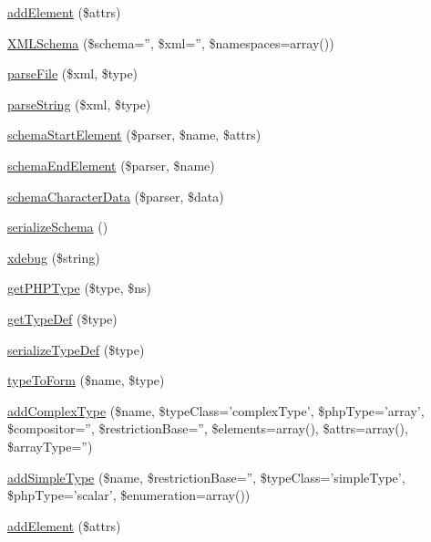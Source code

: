 \begin{DoxyCompactItemize}
\hyperlink{class_x_m_l_schema_a7341d393047f63fdcb50dd44d2eff448}{add\-Element} (\$attrs)
\item 
\hyperlink{class_x_m_l_schema_a61d4e34cfda30d67186a9a6094c6d7c9}{X\-M\-L\-Schema} (\$schema='', \$xml='', \$namespaces=array())
\item 
\hyperlink{class_x_m_l_schema_a4495d09bfd675f7fbd6b6918ecc84795}{parse\-File} (\$xml, \$type)
\item 
\hyperlink{class_x_m_l_schema_ad3efb7e0aa9ceb47b09783473a7deae6}{parse\-String} (\$xml, \$type)
\item 
\hyperlink{class_x_m_l_schema_abe761abcfe8369fb87739c8d776eead0}{schema\-Start\-Element} (\$parser, \$name, \$attrs)
\item 
\hyperlink{class_x_m_l_schema_a8e536da75a8a0d3f44d6d275ff4229c9}{schema\-End\-Element} (\$parser, \$name)
\item 
\hyperlink{class_x_m_l_schema_af69d1aa4838f91acf8066b8f33e2a016}{schema\-Character\-Data} (\$parser, \$data)
\item 
\hyperlink{class_x_m_l_schema_ae1f5bc3d8e49c4592e8d00d7890f3e47}{serialize\-Schema} ()
\item 
\hyperlink{class_x_m_l_schema_af7f8d34ac5331189b07d83cb9fa5f4e9}{xdebug} (\$string)
\item 
\hyperlink{class_x_m_l_schema_aebfbaab31cdb69fabf5a7c5f2bbd605b}{get\-P\-H\-P\-Type} (\$type, \$ns)
\item 
\hyperlink{class_x_m_l_schema_a4d3354e230b2cbe9cbf168665ef0a79d}{get\-Type\-Def} (\$type)
\item 
\hyperlink{class_x_m_l_schema_a6ede91c15c6a31e99181cd698f06365c}{serialize\-Type\-Def} (\$type)
\item 
\hyperlink{class_x_m_l_schema_ad829fa57be032e351ebf74b60918c8ba}{type\-To\-Form} (\$name, \$type)
\item 
\hyperlink{class_x_m_l_schema_a8086789ccd44f879ab77ba98dfa08aa2}{add\-Complex\-Type} (\$name, \$type\-Class='complex\-Type', \$php\-Type='array', \$compositor='', \$restriction\-Base='', \$elements=array(), \$attrs=array(), \$array\-Type='')
\item 
\hyperlink{class_x_m_l_schema_a31228a55d8cdb602e32f481406e7455c}{add\-Simple\-Type} (\$name, \$restriction\-Base='', \$type\-Class='simple\-Type', \$php\-Type='scalar', \$enumeration=array())
\item 
\hyperlink{class_x_m_l_schema_a7341d393047f63fdcb50dd44d2eff448}{add\-Element} (\$attrs)
\end{DoxyCompactItemize}

